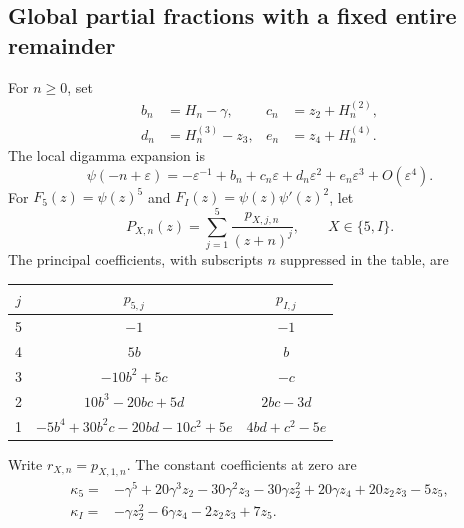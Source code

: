 \documentclass[11pt,a4paper]{article}
\numberwithin{equation}{section}
\theoremstyle{definition}
\begin{document}
\subsection{Global partial fractions with a fixed entire remainder}

For $n\geq0$, set
\begin{equation}\label{q5:localcoeffs}
 \begin{aligned}
 b_n&=H_n-\gamma,&
 c_n&=z_2+H_n^{(2)},\\
 d_n&=H_n^{(3)}-z_3,&
 e_n&=z_4+H_n^{(4)}.
 \end{aligned}
\end{equation}
The local digamma expansion is
\[
 \psi(-n+\varepsilon)
 =-\varepsilon^{-1}+b_n+c_n\varepsilon
       +d_n\varepsilon^2+e_n\varepsilon^3+O(\varepsilon^4).
\]
For $F_5(z)=\psi(z)^5$ and $F_I(z)=\psi(z)\psi'(z)^2$, let
\[
 P_{X,n}(z)=\sum_{j=1}^5\frac{p_{X,j,n}}{(z+n)^j},
 \qquad X\in\{5,I\}.
\]
The principal coefficients, with subscripts $n$ suppressed in the table,
are
\begin{center}
\begin{tabular}{c|c|c}
$j$&$p_{5,j}$&$p_{I,j}$\\\hline
5&$-1$&$-1$\\
4&$5b$&$b$\\
3&$-10b^2+5c$&$-c$\\
2&$10b^3-20bc+5d$&$2bc-3d$\\
1&$-5b^4+30b^2c-20bd-10c^2+5e$&$4bd+c^2-5e$
\end{tabular}
\end{center}
Write $r_{X,n}=p_{X,1,n}$.  The constant coefficients at zero are
\begin{align}
 \kappa_5={}&-\gamma^5+20\gamma^3z_2-30\gamma^2z_3
         -30\gamma z_2^2+20\gamma z_4+20z_2z_3-5z_5,
 \label{q5:kappa5}\\
 \kappa_I={}&-\gamma z_2^2-6\gamma z_4-2z_2z_3+7z_5.
 \label{q5:kappaI}
\end{align}
\end{document}
